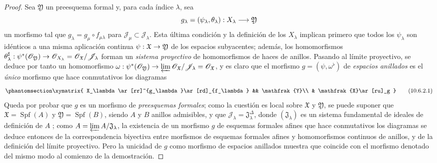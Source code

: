 \documentclass[oneside]{amsart}
\theoremstyle{ega-env-style}
\theoremstyle{ega-thm-env-style}
\theoremstyle{ega-defn-env-style}
\renewcommand{\to}{\mathchoice{\longrightarrow}{\rightarrow}{\rightarrow}{\rightarrow}}
\let\EGAOriginalLabel\label
\renewcommand{\label}[1]{\phantomsection\EGAOriginalLabel{#1}}
\begin{document}
\begin{proof}
Sea $\mathfrak{Y}$ un preesquema formal y, para cada índice $\lambda$, sea
\[
  g_\lambda=(\psi_\lambda,\theta_\lambda):X_\lambda\to\mathfrak{Y}
\]
un morfismo tal que $g_\lambda=g_\mu\circ f_{\mu\lambda}$ para $\mathscr{J}_\mu\subset\mathscr{J}_\lambda$.
Esta última condición y la definición de los $X_\lambda$ implican primero que todos los $\psi_\lambda$ son idénticos a una misma aplicación continua $\psi:\mathfrak{X}\to\mathfrak{Y}$ de los espacios subyacentes; además, los homomorfismos $\theta_\lambda^\sharp:\psi^*(\mathscr{O}_{\mathfrak{Y}})\to
\mathscr{O}_{X_\lambda}=
\mathscr{O}_{\mathfrak{X}}/\mathscr{J}_\lambda$ forman un \emph{sistema proyectivo} de homomorfismos de haces de anillos.
Pasando al límite proyectivo, se deduce por tanto un homomorfismo $\omega:\psi^*(\mathscr{O}_{\mathfrak{Y}})\to
  \varprojlim\mathscr{O}_{\mathfrak{X}}/\mathscr{J}_\lambda
  =\mathscr{O}_{\mathfrak{X}}$, y es claro que el morfismo $g=(\psi,\omega^\flat)$ de \emph{espacios anillados} es el \emph{único} morfismo que hace conmutativos los diagramas
\[
  \label{I.10.6.2.1-fr}
  \xymatrix{
    X_\lambda\ar[rr]^{g_\lambda}\ar[rd]_{f_\lambda} &&
    \mathfrak{Y}\\
    & \mathfrak{X}\ar[ru]_g
  }
  \tag{10.6.2.1}
\]
Queda por probar que $g$ es un morfismo de \emph{preesquemas formales}; como la cuestión es local sobre $\mathfrak{X}$ y $\mathfrak{Y}$, se puede suponer que $\mathfrak{X}=\operatorname{Spf}(A)$ y $\mathfrak{Y}=\operatorname{Spf}(B)$, siendo $A$ y $B$ anillos admisibles, y que $\mathscr{J}_\lambda=\mathfrak{J}_\lambda^{\Delta}$, donde $(\mathfrak{J}_\lambda)$ es un sistema fundamental de ideales de definición de $A$ ; como $A=\varprojlim A/\mathfrak{J}_\lambda$, la existencia de un morfismo $g$ de esquemas formales afines que hace conmutativos los diagramas  se deduce entonces de la correspondencia biyectiva  entre morfismos de esquemas formales afines y homomorfismos continuos de anillos, y de la definición del límite proyectivo.
Pero la unicidad de $g$ como morfismo de espacios anillados muestra que coincide con el morfismo denotado del mismo modo al comienzo de la demostración.
\end{proof}
\end{document}
